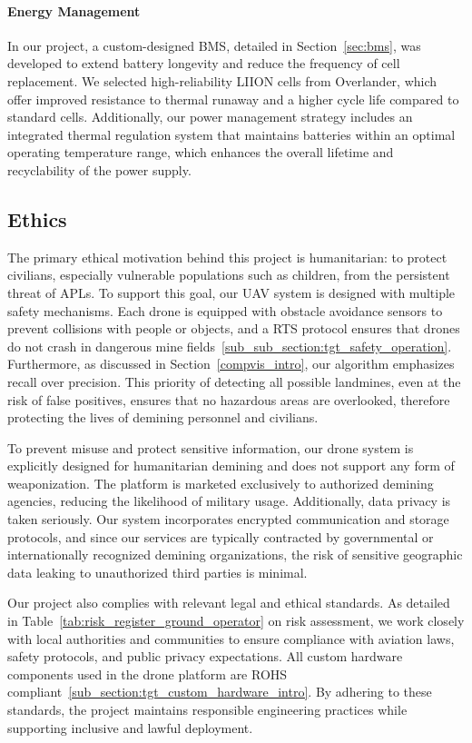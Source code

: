 \paragraph{Energy Management}

In our project, a custom-designed \gls{BMS}, detailed in Section~\ref{sec:bms}, was developed to extend battery longevity and reduce the frequency of cell replacement. We selected high-reliability \gls{LIION} cells from Overlander, which offer improved resistance to thermal runaway and a higher cycle life compared to standard cells. Additionally, our power management strategy includes an integrated thermal regulation system that maintains batteries within an optimal operating temperature range, which enhances the overall lifetime and recyclability of the power supply.


\subsection{Ethics}\label{ethics}

The primary ethical motivation behind this project is humanitarian: to protect civilians, especially vulnerable populations such as children, from the persistent threat of \gls{APL}s. To support this goal, our \gls{UAV} system is designed with multiple safety mechanisms. Each drone is equipped with obstacle avoidance sensors to prevent collisions with people or objects, and a \gls{RTS} protocol ensures that drones do not crash in dangerous mine fields~\ref{sub_sub_section:tgt_safety_operation}. Furthermore, as discussed in Section~\ref{compvis_intro}, our algorithm emphasizes recall over precision. This priority of detecting all possible landmines, even at the risk of false positives, ensures that no hazardous areas are overlooked, therefore protecting the lives of demining personnel and civilians.

To prevent misuse and protect sensitive information, our drone system is explicitly designed for humanitarian demining and does not support any form of weaponization. The platform is marketed exclusively to authorized demining agencies, reducing the likelihood of military usage. Additionally, data privacy is taken seriously. Our system incorporates encrypted communication and storage protocols, and since our services are typically contracted by governmental or internationally recognized demining organizations, the risk of sensitive geographic data leaking to unauthorized third parties is minimal.

Our project also complies with relevant legal and ethical standards. As detailed in Table~\ref{tab:risk_register_ground_operator} on risk assessment, we work closely with local authorities and communities to ensure compliance with aviation laws, safety protocols, and public privacy expectations. All custom hardware components used in the drone platform are \gls{ROHS} compliant~\ref{sub_section:tgt_custom_hardware_intro}. By adhering to these standards, the project maintains responsible engineering practices while supporting inclusive and lawful deployment.

